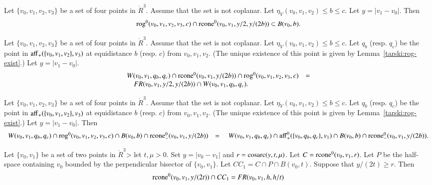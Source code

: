 \newpage

\begin{lemma}
Let $\{v_0,v_1,v_2,v_3\}$ be a set of four points in $\ring{R}^3$.
Assume that the set is not coplanar.
Let $\eta_V(v_0,v_1,v_2)\le b\le c$.  Let $y=|v_1-v_0|$.
Then
$$
{\operatorname{rog}}^0(v_0,v_1,v_2,v_3,c) \cap {\operatorname{rcone}}^0(v_0,v_1,y/2,y/(2b))
\subset B(v_0,b).
$$
\end{lemma}

\newpage

\begin{lemma}
Let $\{v_0,v_1,v_2,v_3\}$ be a set of four points in $\ring{R}^3$.
Assume that the set is not coplanar.
Let $\eta_V(v_0,v_1,v_2)\le b \le c$.  
Let $q_b$ (resp. $q_c$) be the point
in ${\operatorname{aff}}_+(\{v_0,v_1,v_2\},v_3)$ at equidistance $b$ (resp. $c$)
from $v_0,v_1,v_2$.  (The unique existence of this point is given
by Lemma~\ref{tarski:rog-exist}.)   Let $y = |v_1-v_0|$.
$$
\begin{array}{lll}
W(v_0,v_1,q_b,q_c) \cap {\operatorname{rcone}}^0(v_0,v_1,y/(2b))
\cap {\operatorname{rog}}^0(v_0,v_1,v_2,v_3,c) &=\\
\quad FR(v_0,v_1,y/2,y/(2b))\cap W(v_0,v_1,q_b,q_c).
\end{array}
$$
\end{lemma}

\newpage

\begin{lemma}
Let $\{v_0,v_1,v_2,v_3\}$ be a set of four points in $\ring{R}^3$.
Assume that the set is not coplanar.
Let $\eta_V(v_0,v_1,v_2)\le b \le c$.  
Let $q_b$ (resp. $q_c$) be the point
in ${\operatorname{aff}}_+(\{v_0,v_1,v_2\},v_3)$ at equidistance $b$ (resp. $c$)
from $v_0,v_1,v_2$.  (The unique existence of this point is given
by Lemma~\ref{tarski:rog-exist}.)   Let $y = |v_1-v_0|$.
Then
$$
\begin{array}{lll}
W(v_0,v_1,q_b,q_c)  \cap {\operatorname{rog}}^0(v_0,v_1,v_2,v_3,c)\cap
B(v_0,b) \cap {\operatorname{rcone}}_-^0(v_0,v_1,y/(2b)) &=
\quad
W(v_0,v_1,q_b,q_c)  \cap {\operatorname{aff}}_+^0(\{v_0,q_b,q_c\},v_1)\cap
B(v_0,b) \cap {\operatorname{rcone}}_-^0(v_0,v_1,y/(2b)).
\end{array}
$$
\end{lemma}


\newpage

\begin{lemma}
Let $\{v_0,v_1\}$ be a set of two points in $\ring{R}^3$>
let $t,\mu > 0$.  Set $y=|v_0-v_1|$
and $r={\operatorname{cosarc}}(y,t,\mu)$.
Let $C={\operatorname{rcone}}^0(v_0,v_1,r)$.
Let $P$ be the half-space containing $v_0$ bounded by
the perpendicular bisector of  $\{v_0,v_1\}$.
Let $CC_1 = C\cap P \cap B(v_0,t)$.
Suppose that $y/(2t) \ge r$.
Then
  $$
  {\operatorname{rcone}}^0(v_0,v_1,y/(2t))\cap CC_1 = FR(v_0,v_1,h,h/t)
  $$
\end{lemma}

